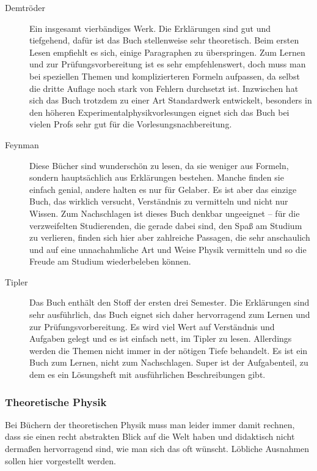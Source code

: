 \begin{description}
\item[Demtröder]{
		Ein insgesamt vierbändiges Werk. Die Erklärungen sind gut und tiefgehend, dafür ist das Buch stellenweise sehr theoretisch. Beim ersten Lesen empfiehlt es sich, einige Paragraphen zu überspringen. Zum Lernen und zur Prüfungsvorbereitung ist es sehr empfehlenswert, doch muss man bei speziellen Themen und komplizierteren Formeln aufpassen, da selbst die dritte Auflage noch stark von Fehlern durchsetzt ist. Inzwischen hat sich das Buch trotzdem zu einer Art Standardwerk entwickelt, besonders in den höheren Experimentalphysikvorlesungen eignet sich das Buch bei vielen Profs sehr gut für die Vorlesungsnachbereitung.}

\item[Feynman]{
		Diese Bücher sind wunderschön zu lesen, da sie weniger aus Formeln, sondern hauptsächlich aus Erklärungen bestehen. Manche finden sie einfach genial, andere halten es nur für Gelaber. Es ist aber das einzige Buch, das wirklich versucht, Verständnis zu vermitteln und nicht nur Wissen. Zum Nachschlagen ist dieses Buch denkbar ungeeignet -- für die verzweifelten Studierenden, die gerade dabei sind, den Spaß am Studium zu verlieren, finden sich hier aber zahlreiche Passagen, die sehr anschaulich und auf eine unnachahmliche Art und Weise Physik vermitteln und so die Freude am Studium wiederbeleben können.}

\item[Tipler]{
		Das Buch enthält den Stoff der ersten drei Semester. Die Erklärungen sind sehr ausführlich, das Buch eignet sich daher hervorragend zum Lernen und zur Prüfungsvorbereitung. Es wird viel Wert auf Verständnis und Aufgaben gelegt und es ist einfach nett, im Tipler zu lesen. Allerdings werden die Themen nicht immer in der nötigen Tiefe behandelt. Es ist ein Buch zum Lernen, nicht zum Nachschlagen. Super ist der Aufgabenteil, zu dem es ein Lösungsheft mit ausführlichen Beschreibungen gibt.}
\end{description}

\vspace{-1mm}

\subsubsection{Theoretische Physik}

Bei Büchern der theoretischen Physik muss man leider immer damit rechnen, dass sie einen recht abstrakten Blick auf die Welt haben und didaktisch nicht dermaßen hervorragend sind, wie man sich das oft wünscht. Löbliche Ausnahmen sollen hier vorgestellt werden.

